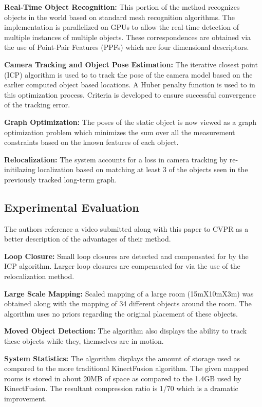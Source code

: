 \documentclass[10pt,twocolumn,letterpaper]{article}
\begin{document}
\textbf{Real-Time Object Recognition:} This portion of the method recognizes objects in the world based on standard mesh recognition algorithms. The implementation is parallelized on GPUs to allow the real-time detection of multiple instances of multiple objects. These correspondences are obtained via the use of Point-Pair Features (PPFs) which are four dimensional descriptors. 

\textbf{Camera Tracking and Object Pose Estimation:} The iterative closest point (ICP) algorithm is used to to track the pose of the camera model based on the earlier computed object based locations. A Huber penalty function is used to in this optimization process. Criteria is developed to ensure successful convergence of the tracking error.

\textbf{Graph Optimization:} The poses of the static object is now viewed as a graph optimization problem which minimizes the sum over all the measurement constraints based on the known features of each object.

\textbf{Relocalization:} The system accounts for a loss in camera tracking by re-initilazing localization based on matching at least 3 of the objects seen in the previously tracked long-term graph. 

\subsection{Experimental Evaluation}
The authors reference a video submitted along with this paper to CVPR as a better description of the advantages of their method. 

\textbf{Loop Closure:} Small loop closures are detected and compensated for by the ICP algorithm. Larger loop closures are compensated for via the use of the relocalization method. 

\textbf{Large Scale Mapping:} Scaled mapping of a large room (15mX10mX3m) was obtained along with the mapping of 34 different objects around the room. The algorithm uses no priors regarding the original placement of these objects.

\textbf{Moved Object Detection:} The algorithm also displays the ability to track these objects while they, themselves are in motion. 

\textbf{System Statistics:} The algorithm displays the amount of storage used as compared to the more traditional KinectFusion algorithm. The given mapped rooms is stored in about 20MB of space as compared to the 1.4GB used by KinectFusion. The resultant compression ratio is 1/70 which is a dramatic improvement. 
\end{document}
